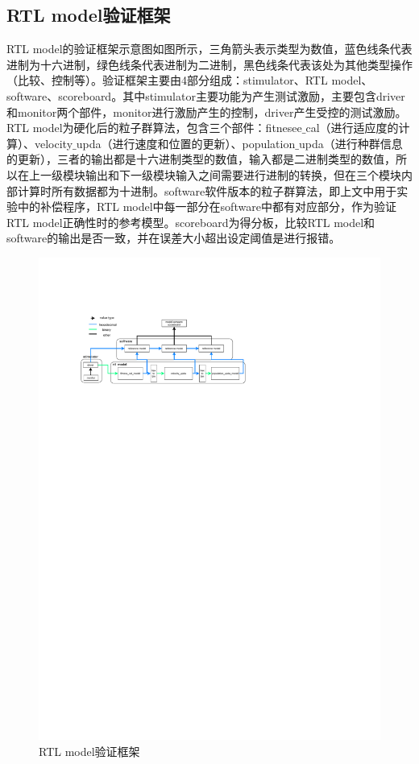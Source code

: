 \subsection{RTL model验证框架}
RTL model的验证框架示意图如图所示，三角箭头表示类型为数值，蓝色线条代表进制为十六进制，绿色线条代表进制为二进制，黑色线条代表该处为其他类型操作（比较、控制等）。验证框架主要由4部分组成：stimulator、RTL model、software、scoreboard。其中stimulator主要功能为产生测试激励，主要包含driver和monitor两个部件，monitor进行激励产生的控制，driver产生受控的测试激励。RTL model为硬化后的粒子群算法，包含三个部件：fitnesee$\_$cal（进行适应度的计算）、velocity$\_$upda（进行速度和位置的更新）、population$\_$upda（进行种群信息的更新），三者的输出都是十六进制类型的数值，输入都是二进制类型的数值，所以在上一级模块输出和下一级模块输入之间需要进行进制的转换，但在三个模块内部计算时所有数据都为十进制。software软件版本的粒子群算法，即上文中用于实验中的补偿程序，RTL model中每一部分在software中都有对应部分，作为验证RTL model正确性时的参考模型。scoreboard为得分板，比较RTL model和software的输出是否一致，并在误差大小超出设定阈值是进行报错。
\begin{figure}[htb]
  \centering
  \includegraphics[width=14cm]{fig/4-fig/rtl_model验证环境.pdf}
  \caption{RTL model验证框架}
  \label{fig:RTL model验证框架}
\end{figure}

